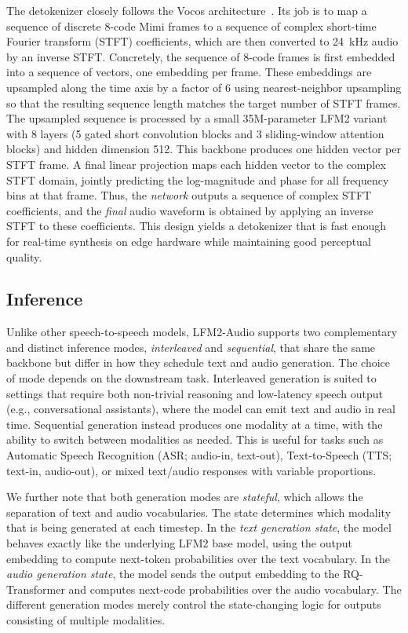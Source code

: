 \documentclass{article}
\begin{document}
The detokenizer closely follows the Vocos architecture~\citep{siuzdak2023vocos}. Its job is to map a sequence of discrete 8-code Mimi frames to a sequence of complex short-time Fourier transform (STFT) coefficients, which are then converted to 24~kHz audio by an inverse STFT. Concretely, the sequence of 8-code frames is first embedded into a sequence of vectors, one embedding per frame. These embeddings are upsampled along the time axis by a factor of 6 using nearest-neighbor upsampling so that the resulting sequence length matches the target number of STFT frames. The upsampled sequence is processed by a small 35M-parameter LFM2 variant with 8 layers (5 gated short convolution blocks and 3 sliding-window attention blocks) and hidden dimension 512. This backbone produces one hidden vector per STFT frame. A final linear projection maps each hidden vector to the complex STFT domain, jointly predicting the log-magnitude and phase for all frequency bins at that frame. Thus, the \emph{network} outputs a sequence of complex STFT coefficients, and the \emph{final} audio waveform is obtained by applying an inverse STFT to these coefficients. This design yields a detokenizer that is fast enough for real-time synthesis on edge hardware while maintaining good perceptual quality.


\subsection{Inference}
\label{sec:audio_inference}
Unlike other speech-to-speech models, LFM2-Audio supports two complementary and distinct inference modes, \emph{interleaved} and \emph{sequential}, that share the same backbone but differ in how they schedule text and audio generation. The choice of mode depends on the downstream task. Interleaved generation is suited to settings that require both non-trivial reasoning and low-latency speech output (e.g., conversational assistants), where the model can emit text and audio in real time. Sequential generation instead produces one modality at a time, with the ability to switch between modalities as needed. This is useful for tasks such as Automatic Speech Recognition (ASR; audio-in, text-out), Text-to-Speech (TTS; text-in, audio-out), or mixed text/audio responses with variable proportions.




We further note that both generation modes are \emph{stateful}, which allows the separation of text and audio vocabularies. The state determines which modality that is being generated at each timestep. In the \emph{text generation state}, the model behaves exactly like the underlying LFM2 base model, using the output embedding to compute next-token probabilities over the text vocabulary. In the \emph{audio generation state}, the model sends the output embedding to the RQ-Transformer and computes next-code probabilities over the audio vocabulary. The different generation modes merely control the state-changing logic for outputs consisting of multiple modalities.
\end{document}
